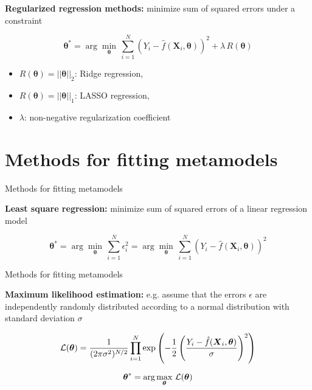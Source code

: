 \documentclass{beamer}
\begin{document}

\begin{frame}

{\bf Regularized regression methods:} minimize sum of squared errors under a constraint

\[
\boldsymbol{\theta}^* = \arg \min_{\boldsymbol{\theta}} \, \sum_{i=1}^N (Y_i - \hat{f}(\boldsymbol{X}_i, \boldsymbol{\theta}))^2 + \lambda \, R(\boldsymbol{\theta})
\]

\begin{itemize}
\item $R(\boldsymbol{\theta}) = ||\boldsymbol{\theta}||_2$: Ridge regression,
\item $R(\boldsymbol{\theta}) = ||\boldsymbol{\theta}||_1$: LASSO regression,
\item $\lambda$: non-negative regularization coefficient
\end{itemize}

\end{frame}
  

\section{Methods for fitting metamodels}
\begin{frame}[t]{Methods for fitting metamodels}

{\bf Least square regression:} minimize sum of squared errors of a linear regression model

\[
\boldsymbol{\theta}^* = \arg \min_{\boldsymbol{\theta}} \, \sum_{i=1}^N \epsilon_i^2 =\arg \min_{\boldsymbol{\theta}} \, \sum_{i=1}^N (Y_i - \hat{f}(\boldsymbol{X}_i, \boldsymbol{\theta}))^2
\]

\end{frame}


\begin{frame}[t]{Methods for fitting metamodels}

{\bf Maximum likelihood estimation:} e.g. assume that the errors $\epsilon$ are independently randomly distributed according to a normal distribution with standard deviation $\sigma$

\[
\mathcal{L}(\boldsymbol{\theta}) = \frac{1}{ (2 \pi \sigma^2)^{N/2}} \prod_{i=1}^N \exp\left( - \frac{1}{2} \left( \frac{Y_i - \hat{f}(\boldsymbol{X}_i, \boldsymbol{\theta}) }{\sigma} \right) ^2 \right)
\]

\[
\boldsymbol{\theta}^* = \arg \max_{\boldsymbol{\theta}} \, \mathcal{L}(\boldsymbol{\theta})
\]
  
\end{frame}
\end{document}

